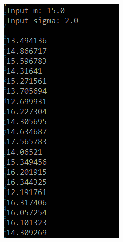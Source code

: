 \documentclass{beamer}
\begin{document}
\begin{frame}
\begin{columns}[T]
\begin{column}{0.35\textwidth}
\includegraphics[width=\textwidth]{res_norm_dist1.png}
\end{column}
\begin{column}{0.45\textwidth}

\end{column}
\end{columns}
\end{frame}
\end{document}
